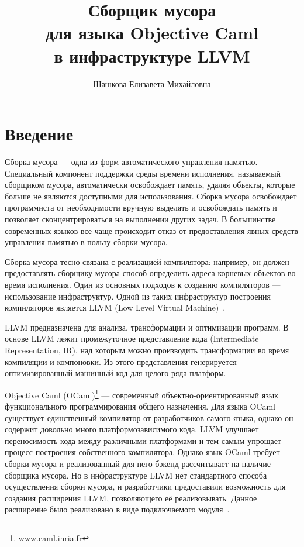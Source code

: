 \title{Сборщик мусора\\
для языка Objective Caml\\
в инфраструктуре LLVM}
%
\author{Шашкова Елизавета Михайловна}
%
%
%

\maketitle              %

\section*{Введение}

Сборка мусора --- одна из форм автоматического управления памятью. Специальный компонент поддержки среды времени исполнения, 
называемый сборщиком мусора, автоматически освобождает 
память, удаляя объекты, которые больше не являются доступными для использования.  Сборка мусора освобождает программиста от 
необходимости вручную выделять и освобождать память и позволяет сконцентрироваться на выполнении других задач.
В большинстве современных языков все чаще происходит отказ от предоставления явных средств управления памятью в пользу сборки мусора.

Сборка мусора тесно связана с реализацией компилятора: например, он должен предоставлять сборщику мусора способ определить адреса корневых объектов во
время исполнения. Один из основных
подходов к созданию компиляторов --- использование инфраструктур. Одной из таких инфраструктур построения компиляторов является LLVM 
(Low Level Virtual Machine)~\cite{LLVM}. 

LLVM предназначена 
для анализа, трансформации и оптимизации программ. В основе LLVM лежит промежуточное представление кода 
(Intermediate Representation, IR), над которым можно производить трансформации во время компиляции и компоновки. 
Из этого представления генерируется оптимизированный машинный код для целого ряда платформ.

Objective Caml (OCaml)\footnote{www.caml.inria.fr} --- современный объектно-ориентированный язык функционального программирования общего назначения.
Для языка OCaml существует единственный компилятор от разработчиков самого языка, однако он содержит довольно много платформозависимого кода.
LLVM улучшает переносимость кода между различными платформами и тем самым упрощает процесс построения 
собственного компилятора. Однако язык OCaml требует сборки мусора и реализованный для него бэкенд рассчитывает на наличие сборщика мусора. Но в 
инфраструктуре LLVM нет стандартного способа осуществления сборки мусора, и разработчики предоставили 
возможность для создания расширения LLVM, позволяющего её реализовывать. Данное расширение было реализовано в виде подключаемого модуля~\cite{samofal}.

